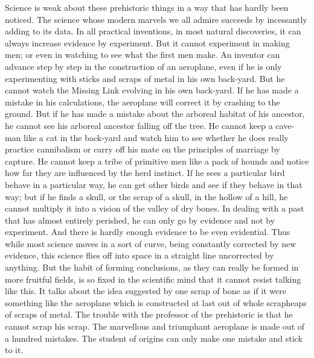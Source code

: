 
Science is weak about these prehistoric things in a way that has hardly been noticed. The science whose modern marvels we all admire succeeds by incessantly adding to its data. In all practical inventions, in most natural discoveries, it can always increase evidence by experiment. But it cannot experiment in making men; or even in watching to see what the first men make. An inventor can advance step by step in the construction of an aeroplane, even if he is only experimenting with sticks and scraps of metal in his own back-yard. But he cannot watch the Missing Link evolving in his own back-yard. If he has made a mistake in his calculations, the aeroplane will correct it by crashing to the ground. But if he has made a mistake about the arboreal habitat of his ancestor, he cannot see his arboreal ancestor falling off the tree. He cannot keep a cave-man like a cat in the back-yard and watch him to see whether he does really practice cannibalism or carry off his mate on the principles of marriage by capture. He cannot keep a tribe of primitive men like a pack of hounds and notice how far they are influenced by the herd instinct. If he sees a particular bird behave in a particular way, he can get other birds and see if they behave in that way; but if he finds a skull, or the scrap of a skull, in the hollow of a hill, he cannot multiply it into a vision of the valley of dry bones. In dealing with a past that has almost entirely perished, he can only go by evidence and not by experiment. And there is hardly enough evidence to be even evidential. Thus while most science moves in a sort of curve, being constantly corrected by new evidence, this science flies off into space in a straight line uncorrected by anything. But the habit of forming conclusions, as they can really be formed in more fruitful fields, is so fixed in the scientific mind that it cannot resist talking like this. It talks about the idea suggested by one scrap of bone as if it were something like the aeroplane which is constructed at last out of whole scrapheaps of scraps of metal. The trouble with the professor of the prehistoric is that he cannot scrap his scrap. The marvellous and triumphant aeroplane is made out of a hundred mistakes. The student of origins can only make one mistake and stick to it.

